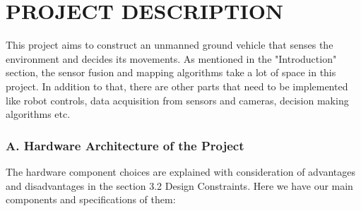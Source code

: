 \documentclass[12pt]{article}
\begin{document}
\section{PROJECT DESCRIPTION}

This project aims to construct an unmanned ground vehicle that senses the environment and decides its movements. As mentioned in the "Introduction" section, the sensor fusion and mapping algorithms take a lot of space in this project. In addition to that, there are other parts that need to be implemented like robot controls, data acquisition from sensors and cameras, decision making algorithms etc. 

    \subsubsection*{A. Hardware Architecture of the Project}

    The hardware component choices are explained with consideration of advantages and disadvantages in the section 3.2 Design Constraints. Here we have our main components and specifications of them: 
\end{document}
